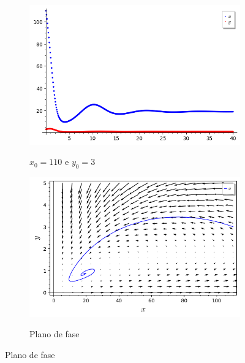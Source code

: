 \begin{figure}[H]
    \centering
    \begin{subfigure}{0.4\textwidth}
        \includegraphics[scale=0.48]{figuras/HT_7.png}
        \label{fig:HT_7}
        \caption{$x_0 = 110$ e $y_0 = 3$}
    \end{subfigure}
    \begin{subfigure}{0.4\textwidth}
        \includegraphics[scale=0.48]{figuras/HT_8.png}
        \label{fig:HT_8}
        \caption{Plano de fase}
    \end{subfigure}
\end{figure}


